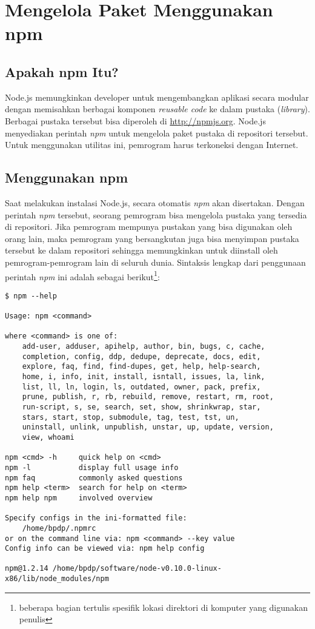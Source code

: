 \chapter{Mengelola Paket Menggunakan npm}

\section{Apakah npm Itu?}

Node.js memungkinkan developer untuk mengembangkan aplikasi secara modular dengan memisahkan berbagai komponen \textit{reusable code} ke dalam pustaka (\textit{library}). Berbagai pustaka tersebut bisa diperoleh di \url{http://npmjs.org}. Node.js menyediakan perintah \textit{npm} untuk mengelola paket pustaka di repositori tersebut. Untuk menggunakan utilitas ini, pemrogram harus terkoneksi dengan Internet.

\section{Menggunakan npm}

Saat melakukan instalasi Node.js, secara otomatis \textit{npm} akan disertakan. Dengan perintah \textit{npm} tersebut, seorang pemrogram bisa mengelola pustaka yang tersedia di repositori. Jika pemrogram mempunya pustakan yang bisa digunakan oleh orang lain, maka pemrogram yang bersangkutan juga bisa menyimpan pustaka tersebut ke dalam repositori sehingga memungkinkan untuk diinstall oleh pemrogram-pemrogram lain di seluruh dunia. Sintaksis lengkap dari penggunaan perintah \textit{npm} ini adalah sebagai berikut\footnote{beberapa bagian tertulis spesifik lokasi direktori di komputer yang digunakan penulis}:

\begin{lstlisting}
$ npm --help

Usage: npm <command>

where <command> is one of:
    add-user, adduser, apihelp, author, bin, bugs, c, cache,
    completion, config, ddp, dedupe, deprecate, docs, edit,
    explore, faq, find, find-dupes, get, help, help-search,
    home, i, info, init, install, isntall, issues, la, link,
    list, ll, ln, login, ls, outdated, owner, pack, prefix,
    prune, publish, r, rb, rebuild, remove, restart, rm, root,
    run-script, s, se, search, set, show, shrinkwrap, star,
    stars, start, stop, submodule, tag, test, tst, un,
    uninstall, unlink, unpublish, unstar, up, update, version,
    view, whoami

npm <cmd> -h     quick help on <cmd>
npm -l           display full usage info
npm faq          commonly asked questions
npm help <term>  search for help on <term>
npm help npm     involved overview

Specify configs in the ini-formatted file:
    /home/bpdp/.npmrc
or on the command line via: npm <command> --key value
Config info can be viewed via: npm help config

npm@1.2.14 /home/bpdp/software/node-v0.10.0-linux-x86/lib/node_modules/npm
\end{lstlisting}

